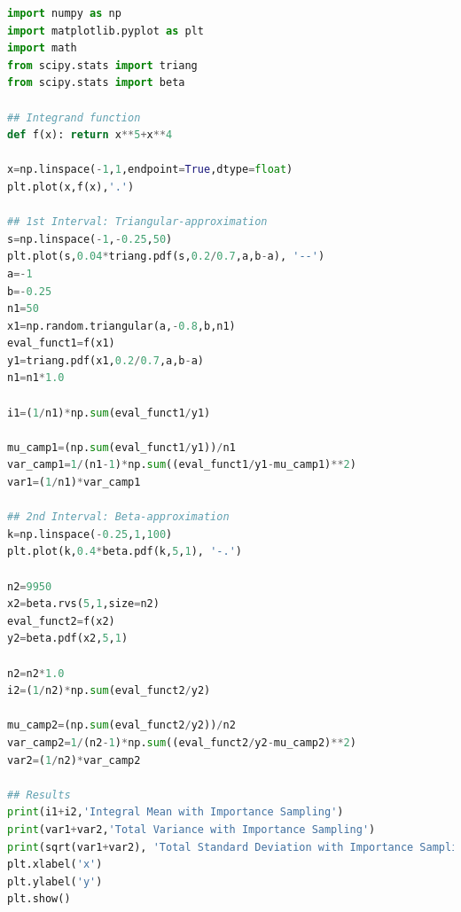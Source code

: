 \begin{lstlisting}[language=python, style=Pystyle, caption=\texttt{Python} code for Importance Sampling Montecarlo Calculation, label=list:ImpSampling, 	captionpos=t]
import numpy as np
import matplotlib.pyplot as plt
import math
from scipy.stats import triang
from scipy.stats import beta

## Integrand function
def f(x): return x**5+x**4

x=np.linspace(-1,1,endpoint=True,dtype=float)
plt.plot(x,f(x),'.')

## 1st Interval: Triangular-approximation
s=np.linspace(-1,-0.25,50)
plt.plot(s,0.04*triang.pdf(s,0.2/0.7,a,b-a), '--')
a=-1
b=-0.25
n1=50
x1=np.random.triangular(a,-0.8,b,n1)  
eval_funct1=f(x1) 
y1=triang.pdf(x1,0.2/0.7,a,b-a)
n1=n1*1.0

i1=(1/n1)*np.sum(eval_funct1/y1)

mu_camp1=(np.sum(eval_funct1/y1))/n1
var_camp1=1/(n1-1)*np.sum((eval_funct1/y1-mu_camp1)**2)
var1=(1/n1)*var_camp1

## 2nd Interval: Beta-approximation
k=np.linspace(-0.25,1,100)
plt.plot(k,0.4*beta.pdf(k,5,1), '-.')

n2=9950
x2=beta.rvs(5,1,size=n2)  
eval_funct2=f(x2) 
y2=beta.pdf(x2,5,1)                     

n2=n2*1.0
i2=(1/n2)*np.sum(eval_funct2/y2)

mu_camp2=(np.sum(eval_funct2/y2))/n2
var_camp2=1/(n2-1)*np.sum((eval_funct2/y2-mu_camp2)**2)
var2=(1/n2)*var_camp2

## Results
print(i1+i2,'Integral Mean with Importance Sampling')
print(var1+var2,'Total Variance with Importance Sampling')
print(sqrt(var1+var2), 'Total Standard Deviation with Importance Sampling')
plt.xlabel('x')
plt.ylabel('y')
plt.show()
\end{lstlisting}

